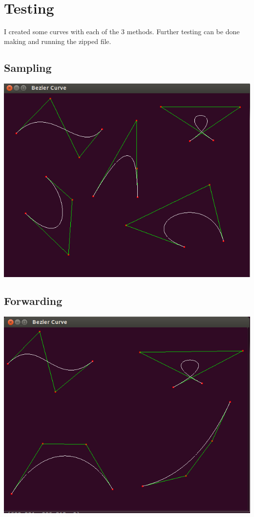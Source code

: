 \documentclass{article}
\begin{document}
\section{Testing}
I created some curves with each of the 3 methods. Further testing can be done making and running the zipped file.
\subsection{Sampling}
\includegraphics[scale=0.4]{SamplePenis.png}\\
\subsection{Forwarding}
\includegraphics[scale=0.4]{ForwardPenis.png}\\
\end{document}
